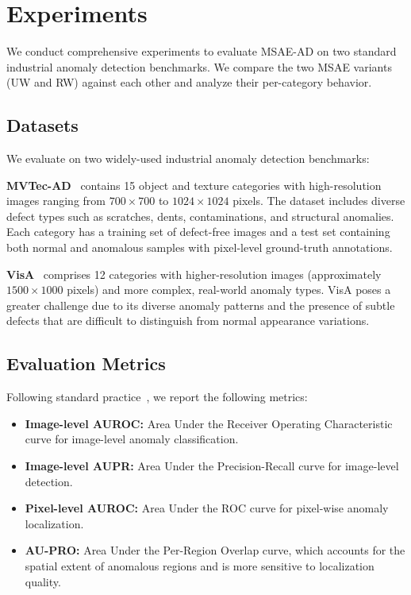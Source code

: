 \section{Experiments}
\label{sec:experiments}

We conduct comprehensive experiments to evaluate MSAE-AD on two standard industrial anomaly detection benchmarks.
We compare the two MSAE variants (UW and RW) against each other and analyze their per-category behavior.

\subsection{Datasets}

We evaluate on two widely-used industrial anomaly detection benchmarks:

\textbf{MVTec-AD}~\cite{Bergmann2019MVTec} contains 15 object and texture categories with high-resolution images ranging from $700 \times 700$ to $1024 \times 1024$ pixels.
The dataset includes diverse defect types such as scratches, dents, contaminations, and structural anomalies.
Each category has a training set of defect-free images and a test set containing both normal and anomalous samples with pixel-level ground-truth annotations.

\textbf{VisA}~\cite{Zou2022VisA} comprises 12 categories with higher-resolution images (approximately $1500 \times 1000$ pixels) and more complex, real-world anomaly types.
VisA poses a greater challenge due to its diverse anomaly patterns and the presence of subtle defects that are difficult to distinguish from normal appearance variations.

\subsection{Evaluation Metrics}

Following standard practice~\cite{Roth2022PatchCore,Deng2024AnomalyDINO,Lendering2025SubspaceAD}, we report the following metrics:

\begin{itemize}
    \item \textbf{Image-level AUROC:} Area Under the Receiver Operating Characteristic curve for image-level anomaly classification.
    \item \textbf{Image-level AUPR:} Area Under the Precision-Recall curve for image-level detection.
    \item \textbf{Pixel-level AUROC:} Area Under the ROC curve for pixel-wise anomaly localization.
    \item \textbf{AU-PRO:} Area Under the Per-Region Overlap curve, which accounts for the spatial extent of anomalous regions and is more sensitive to localization quality.
\end{itemize}

